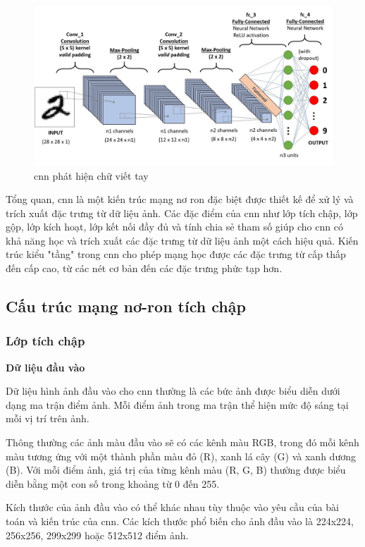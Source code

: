 \begin{figure}
	\centering
	\includegraphics[width=0.9\linewidth]{images/typical-cnn.png}
	\caption{\acrshort{cnn} phát hiện chữ viết tay\cite{ratan_2023}}
	\label{fig:typical-cnn}
\end{figure}

Tổng quan, \acrshort{cnn} là một kiến trúc mạng nơ ron đặc biệt được thiết kế để xử lý và trích xuất đặc trưng từ dữ liệu ảnh. Các đặc điểm của \acrshort{cnn} như lớp tích chập, lớp gộp, lớp kích hoạt, lớp kết nối đầy đủ và tính chia sẻ tham số giúp cho \acrshort{cnn} có khả năng học và trích xuất các đặc trưng từ dữ liệu ảnh một cách hiệu quả. Kiến trúc kiểu "tầng" trong \acrshort{cnn} cho phép mạng học được các đặc trưng từ cấp thấp đến cấp cao, từ các nét cơ bản đến các đặc trưng phức tạp hơn.

\subsection{Cấu trúc mạng nơ-ron tích chập}
\subsubsection{Lớp tích chập}

\textbf{Dữ liệu đầu vào}

Dữ liệu hình ảnh đầu vào cho \acrshort{cnn} thường là các bức ảnh được biểu diễn dưới dạng ma trận điểm ảnh. Mỗi điểm ảnh trong ma trận thể hiện mức độ sáng tại mỗi vị trí trên ảnh.

Thông thường các ảnh màu đầu vào sẽ có các kênh màu RGB, trong đó mỗi kênh màu tương ứng với một thành phần màu đỏ (R), xanh lá cây (G) và xanh dương (B). Với mỗi điểm ảnh, giá trị của từng kênh màu (R, G, B) thường được biểu diễn bằng một con số trong khoảng từ 0 đến 255.

Kích thước của ảnh đầu vào có thể khác nhau tùy thuộc vào yêu cầu của bài toán và kiến trúc của \acrshort{cnn}. Các kích thước phổ biến cho ảnh đầu vào là 224x224, 256x256, 299x299 hoặc 512x512 điểm ảnh.

